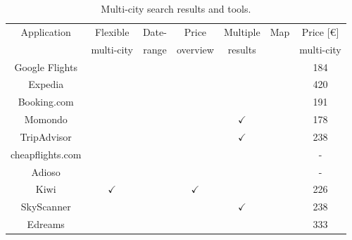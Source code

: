 \begin{table}[]
  \centering
  \caption{Multi-city search results and tools.}
  \label{tab:multi_flights}
  \begin{tabular}{c|c|c|c|c|c|c}
  \hline
\multirow{2}{*}{Application} & Flexible & Date- & Price & Multiple &  \multirow{2}{*}{Map}       & Price [€]    \\ 
 & multi-city & range         & overview      & results       &           & multi-city      \\ \hline
  Google Flights   &   &    &            &            &                          & 184 \\ \hline
  Expedia & &    &            &            &                          & 420                         \\ \hline
  Booking.com &        &    &            &            &                          & 191                         \\ \hline
  Momondo &        &    &            & $\checkmark$ &                          & \cellcolor[HTML]{C0C0C0}178 \\ \hline
  TripAdvisor  &        &    &            & $\checkmark$ &  & 238                         \\ \hline
  cheapflights.com   &     &    &            &            &      & - \\ \hline
  Adioso &        &    &            &            &  & - \\ \hline
  Kiwi     & $\checkmark$ &    & $\checkmark$ &            &                          & 226                         \\ \hline
  SkyScanner &      &    &            & $\checkmark$ &                          & 238                         \\ \hline
  Edreams &     &    &            &            &  & 333                         \\ \hline
  \end{tabular}
\end{table}




